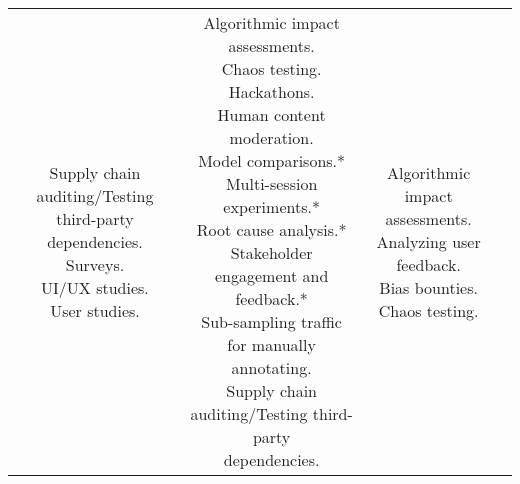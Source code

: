 \documentclass[fleqn]{article}
\begin{document}
\begin{landscape}
\begin{table}[H]
\begin{tabular}{|c|c|c|c|}
{			\textbullet\hspace{3pt} Supply chain auditing/Testing third-party \\\hspace{10pt}dependencies. \\			
			\textbullet\hspace{3pt} Surveys. \\			
			\textbullet\hspace{3pt} UI/UX studies. \\			
			\textbullet\hspace{3pt} User studies. \\
		}	
		& \makecell[l]{
			\textbullet\hspace{3pt} Algorithmic impact assessments.\\ 	
			\textbullet\hspace{3pt} Chaos testing. \\
			\textbullet\hspace{3pt} Hackathons. \\
			\textbullet\hspace{3pt} Human content moderation. \\
			\textbullet\hspace{3pt} Model comparisons.* \\
			\textbullet\hspace{3pt} Multi-session experiments.* \\		
			\textbullet\hspace{3pt} Root cause analysis.* \\					
			\textbullet\hspace{3pt} Stakeholder engagement and feedback.* \\
			\textbullet\hspace{3pt} Sub-sampling traffic for manually annotating. \\
			\textbullet\hspace{3pt} Supply chain auditing/Testing third-party \\\hspace{10pt}dependencies. \\			
		}
		& \makecell[l]{
			\textbullet\hspace{3pt} Algorithmic impact assessments.\\ 	
			\textbullet\hspace{3pt} Analyzing user feedback. \\
			\textbullet\hspace{3pt} Bias bounties. \\	
			\textbullet\hspace{3pt} Chaos testing. \\
}
\end{tabular}
\end{table}
\end{landscape}
\end{document}
